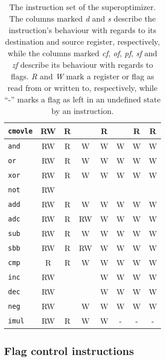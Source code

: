 \documentclass[a4paper,11pt]{kth-mag}
\begin{document}
\begin{table}
\begin{tabular}{l|cc|ccccc}
\verb|cmovle| & RW & R  &           & R         &           & R         & R         \\
\hline
\verb|and|    & RW & R  & W         & W         & W         & W         & W         \\
\verb|or|     & RW & R  & W         & W         & W         & W         & W         \\
\verb|xor|    & RW & R  & W         & W         & W         & W         & W         \\
\verb|not|    & RW &    &           &           &           &           &           \\
\hline
\verb|add|    & RW & R  & W         & W         & W         & W         & W         \\
\verb|adc|    & RW & R  & RW        & W         & W         & W         & W         \\
\verb|sub|    & RW & R  & W         & W         & W         & W         & W         \\
\verb|sbb|    & RW & R  & RW        & W         & W         & W         & W         \\
\verb|cmp|    & R  & R  & W         & W         & W         & W         & W         \\
\verb|inc|    & RW &    &           & W         & W         & W         & W         \\
\verb|dec|    & RW &    &           & W         & W         & W         & W         \\
\verb|neg|    & RW &    & W         & W         & W         & W         & W         \\
\hline
\verb|imul|   & RW & R  & W         & W         & -         & -         & -         \\
\end{tabular}
\caption{The instruction set of the superoptimizer.
The columns marked \emph{d} and \emph{s} describe the instruction's behaviour with regards to its destination and source register, respectively,
while the columns marked \emph{cf}, \emph{of}, \emph{pf}, \emph{sf} and \emph{zf} describe its behaviour with regards to flags.
\emph{R} and \emph{W} mark a register or flag as read from or written to, respectively, while ``-'' marks a flag as left in an undefined state by an instruction.} %
\label{tab:insns}
\end{table}

\subsection{Flag control instructions}
\end{document}

